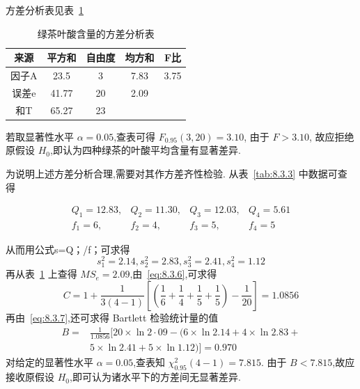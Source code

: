 \begin{example}
方差分析表见表~\ref{tab:8.3.4}

\begin{table}[htbp]
  \centering
  \caption{绿茶叶酸含量的方差分析表}
    \begin{tabular}{ccccc}
    \toprule
    来源    & 平方和   & 自由度   & 均方和   & F比 \\
    \midrule
    因子A   & 23.5  & 3     & 7.83  & 3.75 \\
    误差e   & 41.77 & 20    & 2.09  &  \\
    \midrule
    和T    & 65.27 & 23    &       &  \\
    \bottomrule
    \end{tabular}%
  \label{tab:8.3.4}%
\end{table}%
若取显著性水平 $\alpha=0.05$,查表可得 $F_{0.95}(3,20) = 3.10$, 由于 $F > 3.10$, 故应拒绝原假设 $H_0$,即认为四种绿茶的叶酸平均含量有显著差异.

为说明上述方差分析合理,需要对其作方差齐性检验. 从表~\ref{tab:8.3.3} 中数据可查得

\begin{equation*}
\begin{array}{llll}{Q_{1}=12.83,} & {Q_{2}=11.30,} & {Q_{3}=12.03,} & {Q_{4}=5.61} \\ {f_{1}=6,} & {f_{2}=4,} & {f_{3}=5,} & {f_{4}=5}\end{array}
\end{equation*}

从而用公式s=Q；/f；可求得
\begin{equation*}
  s_{1}^{2}=2.14, s_{2}^{2}=2.83, s_{3}^{2}=2.41, s_{4}^{2}=1.12
\end{equation*}
再从表~\ref{tab:8.3.4} 上查得 $MS_{e}=2.09$,由~\eqref{eq:8.3.6},可求得
\begin{equation*}
  C=1+\frac{1}{3(4-1)}\left[\left(\frac{1}{6}+\frac{1}{4}+\frac{1}{5}+\frac{1}{5}\right)-\frac{1}{20}\right]=1.0856
\end{equation*}
再由~\eqref{eq:8.3.7},还可求得 Bartlett 检验统计量的值
\begin{equation*}
\begin{aligned} B=& \frac{1}{1.0856}[20 \times \ln 2 \cdot 09-(6 \times \ln 2.14+4 \times \ln 2.83+\\ & 5 \times \ln 2.41+5 \times \ln 1.12 ) ]=0.970 
\end{aligned}
\end{equation*}
对给定的显著性水平 $\alpha=0.05$,查表知 $\chi^2_{0.95}(4-1)=7.815$. 由于 $B<7.815$,故应接收原假设 $H_0$,即可认为诸水平下的方差间无显著差异.
\end{example}

